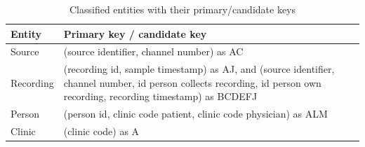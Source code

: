 \begin{table}[ht]
\begin{center}
\begin{tabular}{ |p{3cm}||p{10cm}|}
 \hline
 Entity& Primary key / candidate key\\
 \hline
 Source& (source identifier, channel number) as AC\\
 \hline
 Recording& (recording id, sample timestamp) as AJ, and (source identifier, channel number, id person collects recording, id person own recording, recording timestamp) as BCDEFJ\\
 \hline
 Person& (person id, clinic code patient, clinic code physician) as ALM\\
 \hline
 Clinic& (clinic code) as A\\
 \hline
\end{tabular}
\end{center}
\caption{Classified entities with their primary/candidate keys}
\label{tab:entitiesPrimaryKey}
\end{table}
